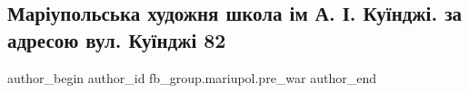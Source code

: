  
 
 
 
 

\subsection{Маріупольська художня школа ім А. І. Куїнджі. за адресою вул. Куїнджі 82}
\label{sec:31_01_2023.fb.fb_group.mariupol.pre_war.3.mar_upolska_khudozhn}

\ifcmt
 author_begin
   author_id fb_group.mariupol.pre_war
 author_end
\fi
